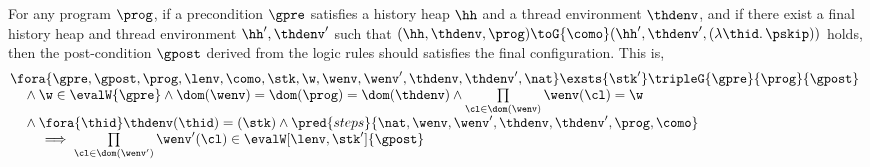 \begin{theorem}
For any program \( \prog \), if a precondition \( \gpre \) satisfies a history heap \( \hh \) and a thread environment \( \thdenv \), and if there exist a final history heap and thread environment \( \hh', \thdenv' \)  such that \( (\hh, \thdenv, \prog) \toG{\como} (\hh', \thdenv', (\lambda \thid \ldotp \pskip) ) \) holds, then the post-condition \( \gpost \) derived from the logic rules should satisfies the final configuration.
This is,
\[
\begin{array}{@{}l}
\fora{\gpre, \gpost, \prog, \lenv, \como, \stk, \w, \wenv, \wenv', \thdenv, \thdenv', \nat}  \exsts{\stk'}
    \tripleG{\gpre}{\prog}{\gpost} \\
    \quad {} \land \w \in \evalW{\gpre}
    \land \dom(\wenv) = \dom(\prog) = \dom(\thdenv)
    \land \prod\limits_{\cl \in \dom(\wenv)} \wenv(\cl) = \w \\
    \quad {} \land \fora{\thid} \thdenv(\thid) = (\stk)
    \land \pred{steps}{\nat,\wenv, \wenv', \thdenv, \thdenv',\prog, \como}  \\
    \qquad {} \implies \prod\limits_{\cl \in \dom(\wenv')} \wenv'(\cl) \in \evalW[\lenv, \stk']{\gpost}
\end{array}
\] 
\end{theorem}

